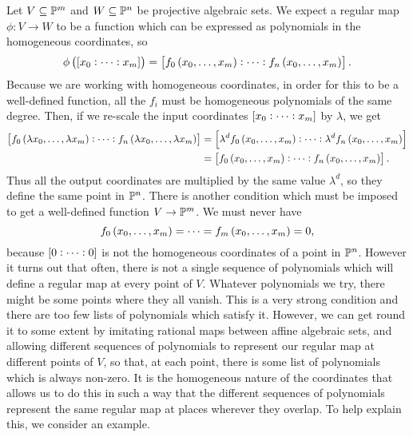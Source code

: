 Let $ V \subseteq \mathbb{P}^m $ and $ W \subseteq \mathbb{P}^n $ be projective algebraic sets. We expect a regular map $ \phi : V \to W $ to be a function which can be expressed as polynomials in the homogeneous coordinates, so
$$ \phi\br{\sbr{x_0 : \dots : x_m}} = \sbr{f_0\br{x_0, \dots, x_m} : \dots : f_n\br{x_0, \dots, x_m}}. $$
Because we are working with homogeneous coordinates, in order for this to be a well-defined function, all the $ f_i $ must be homogeneous polynomials of the same degree. Then, if we re-scale the input coordinates $ \sbr{x_0 : \dots : x_m} $ by $ \lambda $, we get
\begin{align*}
\sbr{f_0\br{\lambda x_0, \dots, \lambda x_m} : \dots : f_n\br{\lambda x_0, \dots, \lambda x_m}}
& = \sbr{\lambda^df_0\br{x_0, \dots, x_m} : \dots : \lambda^df_n\br{x_0, \dots, x_m}} \\
& = \sbr{f_0\br{x_0, \dots, x_m} : \dots : f_n\br{x_0, \dots, x_m}}.
\end{align*}
Thus all the output coordinates are multiplied by the same value $ \lambda^d $, so they define the same point in $ \mathbb{P}^n $. There is another condition which must be imposed to get a well-defined function $ V \to \mathbb{P}^m $. We must never have
$$ f_0\br{x_0, \dots, x_m} = \dots = f_m\br{x_0, \dots, x_m} = 0, $$
because $ \sbr{0 : \dots : 0} $ is not the homogeneous coordinates of a point in $ \mathbb{P}^n $. However it turns out that often, there is not a single sequence of polynomials which will define a regular map at every point of $ V $. Whatever polynomials we try, there might be some points where they all vanish. This is a very strong condition and there are too few lists of polynomials which satisfy it. However, we can get round it to some extent by imitating rational maps between affine algebraic sets, and allowing different sequences of polynomials to represent our regular map at different points of $ V $, so that, at each point, there is some list of polynomials which is always non-zero. It is the homogeneous nature of the coordinates that allows us to do this in such a way that the different sequences of polynomials represent the same regular map at places wherever they overlap. To help explain this, we consider an example.

